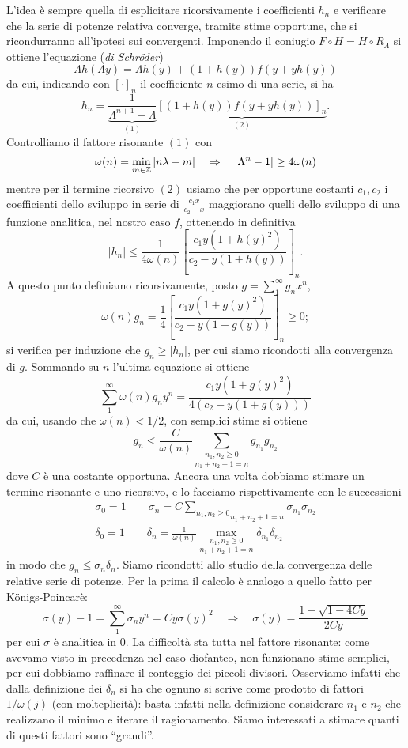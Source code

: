 L'idea è sempre quella di esplicitare ricorsivamente i coefficienti $h_n$ e verificare che la serie di potenze relativa converge, tramite stime opportune, che si ricondurranno all'ipotesi sui convergenti. Imponendo il coniugio $F\circ H=H\circ R_\Lambda$ si ottiene l'equazione (\emph{di Schr\"oder})
\[\Lambda h(\Lambda y)=\Lambda h(y) +(1+h(y))f(y+yh(y))\]
da cui, indicando con $[\cdot]_n$ il coefficiente $n$-esimo di una serie, si ha
\[h_n=\underbrace{\frac{1}{\Lambda^{n+1}-\Lambda}}_{(1)}\underbrace{\left[(1+h(y))f(y+yh(y))\right]_n}_{(2)}.\]
Controlliamo il fattore risonante $(1)$ con 
\[\omega(n)=\min_{m\in \mathbb{Z}} |n\lambda-m| \quad \Rightarrow \quad |\Lambda^n-1|\geq 4\omega(n)\]
mentre per il termine ricorsivo $(2)$ usiamo che per opportune costanti $c_1,c_2$ i coefficienti dello sviluppo in serie di $\frac{c_1 x}{c_2-x}$ maggiorano quelli dello sviluppo di una funzione analitica, nel nostro caso $f$, ottenendo in definitiva
\[|h_n|\leq \frac{1}{4\omega(n)} \left[\frac{c_1 y (1+h(y)^2)}{c_2-y(1+h(y))}\right]_n.\]
A questo punto definiamo ricorsivamente, posto $g=\sum_1^\infty g_n x^n$,
\[\omega(n) g_n=\frac{1}{4} \left[\frac{c_1 y (1+g(y)^2)}{c_2-y(1+g(y))}\right]_n\geq 0;\]
si verifica per induzione che $g_n\geq|h_n|$, per cui siamo ricondotti alla convergenza di $g$. Sommando su $n$ l'ultima equazione si ottiene
\[\sum_1^\infty \omega(n) g_n y^n=\frac{c_1 y (1+g(y)^2)}{4(c_2-y(1+g(y)))} \]
da cui, usando che $\omega(n)<1/2$, con semplici stime si ottiene
\[g_n<\frac{C}{\omega(n)}\underset{n_1+n_2+1=n}{\sum_{n_1,n_2\geq 0}}g_{n_1}g_{n_2}\]
dove $C$ è una costante opportuna. Ancora una volta dobbiamo stimare un termine risonante e uno ricorsivo, e lo facciamo rispettivamente con le successioni
\begin{eqnarray*}
  \sigma_0=1 \qquad
  \sigma_n=C \underset{n_1+n_2+1=n}{\sum_{n_1,n_2\geq 0}}\sigma_{n_1}\sigma_{n_2}
 \\
  \delta_0=1 \qquad
  \delta_n=\frac{1}{\omega(n)}\underset{n_1+n_2+1=n}{\max_{n_1,n_2\geq 0}}\delta_{n_1}\delta_{n_2}
\end{eqnarray*}
in modo che $g_n\leq \sigma_n \delta_n$. Siamo ricondotti allo studio della convergenza delle relative serie di potenze.
Per la prima il calcolo è analogo a quello fatto per K\"onigs-Poincarè: 
\[\sigma(y)-1=\sum_1^\infty \sigma_n y^n=Cy\sigma(y)^2 \quad \Rightarrow \quad \sigma(y)=\frac{1-\sqrt{1-4Cy}}{2Cy}\]
per cui $\sigma$ è analitica in $0$.
La difficoltà sta tutta nel fattore risonante: come avevamo visto in precedenza nel caso diofanteo, non funzionano stime semplici, per cui dobbiamo raffinare il conteggio dei piccoli divisori. Osserviamo infatti che dalla definizione dei $\delta_n$ si ha che ognuno si scrive come prodotto di fattori $1/\omega(j)$ (con molteplicità): basta infatti nella definizione considerare $n_1$ e $n_2$ che realizzano il minimo e iterare il ragionamento. Siamo interessati a stimare quanti di questi fattori sono ``grandi''.\newline\indent
